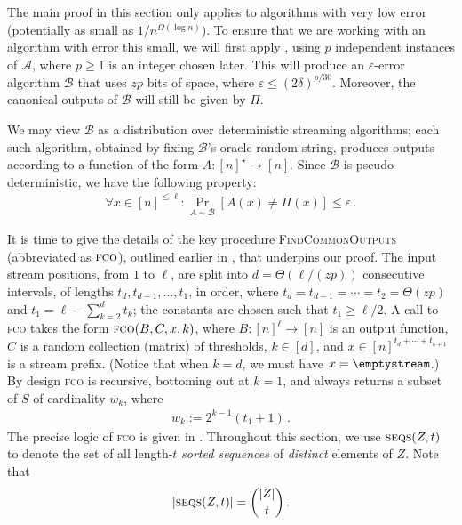 \documentclass[10pt,a4paper]{article}
\theoremstyle{definition}
\theoremstyle{remark}
\newcommand{\cA}{\mathcal{A}}
\newcommand{\cB}{\mathcal{B}}
\let\epsilon\varepsilon
\newcommand{\fco}{\textsc{fco}\xspace}
\newcommand{\rl}{\mathbf{\ell}}             %
\newcommand{\SSD}[2]{\textsc{seqs}(#1,#2)}  %
\begin{document}
\begin{itemize}
\begin{itemize}
The main proof in this section only applies to algorithms with very low error
(potentially as small as $1/n^{\Omega(\log n)}$). To ensure that we are
working with an algorithm with error this small, we will first apply
, using $p$ independent instances of $\cA$,
where $p \ge 1$ is an integer chosen later. This will produce an $\epsilon$-error
algorithm $\cB$ that uses $z p$ bits of space, where $\epsilon \le
(2\delta)^{p/30}$. Moreover, the canonical outputs of $\cB$ will still be
given by $\Pi$.

We may view $\cB$ as a distribution over deterministic streaming algorithms;
each such algorithm, obtained by fixing $\cB$'s oracle random string, produces
outputs according to a function of the form $A \colon [n]^\star \to [n]$.
Since $\cB$ is pseudo-deterministic, we have the following property:
\begin{align}
  \forall x \in [n]^{\le \rl}: \Pr_{A \sim \cB} [A(x) \ne \Pi(x)] \le \epsilon \,. 
  \label{eq:pd-fn-prop}
\end{align}

It is time to give the details of the key procedure \textsc{FindCommonOutputs}
(abbreviated as $\fco$), outlined earlier in ,
that underpins our proof.  The input stream positions, from $1$ to $\rl$, are
split into $d = \Theta(\rl / (zp))$ consecutive intervals, of lengths $t_d,
t_{d-1}, \ldots, t_1$, in order, where $t_d = t_{d-1} = \cdots = t_2 =
\Theta(zp)$ and $t_1 = \rl - \sum_{k=2}^{d} t_k$; the constants are chosen
such that $t_1 \ge \rl/2$. A call to \fco takes the form $\fco(B, C, x,
k)$, where $B \colon [n]^\rl \to [n]$ is an output function, $C$ is a random
collection (matrix) of thresholds, $k \in [d]$, and $x \in [n]^{t_d + \cdots +
t_{k+1}}$ is a stream prefix. (Notice that when $k = d$, we must have $x =
\emptystream$.) By design \fco is recursive, bottoming out at $k = 1$, and
always returns a subset of $S$ of cardinality $w_k$, where
\begin{align}
  w_k := 2^{k-1} (t_1 + 1) \,. \label{eq:wk-def}
\end{align}
The precise logic of \fco is given in . Throughout
this section, we use $\SSD{Z}{t}$ to denote the set of all length-$t$ {\em
sorted sequences} of {\em distinct} elements of $Z$. Note that
\[
  |\SSD{Z}{t}| = \binom{|Z|}{t} \,.
\]

\end{itemize}
\end{itemize}
\end{document}
